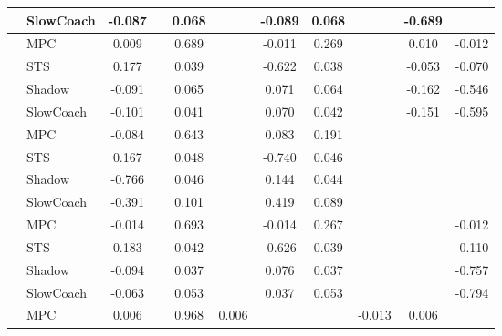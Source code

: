 \begin{tabular}{|l|l|*{9}{c|}}
                                                           & SlowCoach &   -0.087 &        &     0.068 &     & -0.089 &  0.068 &      &  -0.689 &       \\
\midrule
[True, False, True, False, True, True, False, True, True] & MPC &    0.009 &        &     0.689 &     & -0.011 &  0.269 &      &   0.010 &   -0.012 \\
                                                           & STS &    0.177 &        &     0.039 &     & -0.622 &  0.038 &      &  -0.053 &   -0.070 \\
                                                           & Shadow &   -0.091 &        &     0.065 &     &  0.071 &  0.064 &      &  -0.162 &   -0.546 \\
                                                           & SlowCoach &   -0.101 &        &     0.041 &     &  0.070 &  0.042 &      &  -0.151 &   -0.595 \\
\midrule
[True, False, True, False, True, True, False, False, False] & MPC &   -0.084 &        &     0.643 &     &  0.083 &  0.191 &      &      &       \\
                                                           & STS &    0.167 &        &     0.048 &     & -0.740 &  0.046 &      &      &       \\
                                                           & Shadow &   -0.766 &        &     0.046 &     &  0.144 &  0.044 &      &      &       \\
                                                           & SlowCoach &   -0.391 &        &     0.101 &     &  0.419 &  0.089 &      &      &       \\
\midrule
[True, False, True, False, True, True, False, False, True] & MPC &   -0.014 &        &     0.693 &     & -0.014 &  0.267 &      &      &   -0.012 \\
                                                           & STS &    0.183 &        &     0.042 &     & -0.626 &  0.039 &      &      &   -0.110 \\
                                                           & Shadow &   -0.094 &        &     0.037 &     &  0.076 &  0.037 &      &      &   -0.757 \\
                                                           & SlowCoach &   -0.063 &        &     0.053 &     &  0.037 &  0.053 &      &      &   -0.794 \\
\midrule
[True, False, True, True, False, False, True, True, False] & MPC &    0.006 &        &     0.968 &  0.006 &     &     &  -0.013 &   0.006 &       \\

\end{tabular}
